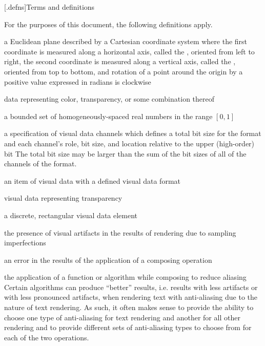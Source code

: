 
[\iotwod.defns]{Terms and definitions}

\pnum
{}
For the purposes of this document, the following definitions apply.

a Euclidean plane described by a Cartesian coordinate system where the first coordinate is measured along a horizontal axis, called the \xaxis, oriented from left to right, the second coordinate is measured along a vertical axis, called the \yaxis, oriented from top to bottom, and rotation of a point around the origin by a positive value expressed in radians is clockwise

data representing color, transparency, or some combination thereof

a bounded set of homogeneously-spaced real numbers in the range $[0,1]$

a specification of visual data channels which defines a total bit size for the format and each channel's role, bit size, and location relative to the upper (high-order) bit
\enternote
The total bit size may be larger than the sum of the bit sizes of all of the channels of the format.
\exitnote

an item of visual data with a defined visual data format

visual data representing transparency

a discrete, rectangular visual data element

the presence of visual artifacts in the results of rendering due to 
sampling imperfections

an error in the results of the application of a composing operation 

the application of a function or algorithm while composing to 
reduce aliasing
\enternote
Certain algorithms can produce ``better'' results, i.e. results with less 
artifacts or with less pronounced artifacts, when rendering text with 
anti-aliasing due to the nature of text rendering. As such, it often makes 
sense to provide the ability to choose one type of anti-aliasing for text 
rendering and another for all other rendering and to provide different sets of 
anti-aliasing types to choose from for each of the two operations.
\exitnote

